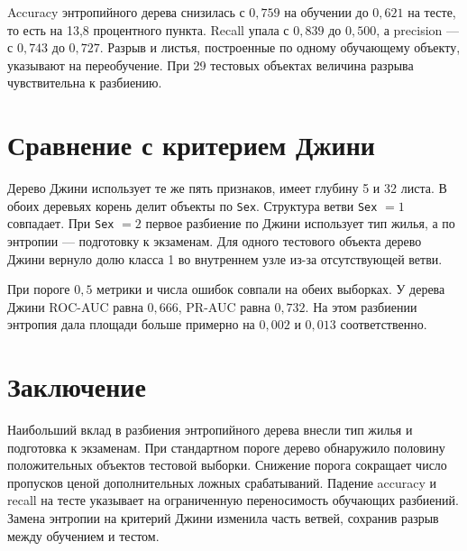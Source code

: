 Accuracy энтропийного дерева снизилась с \(0{,}759\) на обучении до
\(0{,}621\) на тесте, то есть на 13,8 процентного пункта. Recall упала
с \(0{,}839\) до \(0{,}500\), а precision --- с \(0{,}743\) до \(0{,}727\).
Разрыв и листья, построенные по одному обучающему объекту, указывают
на переобучение. При 29 тестовых объектах величина разрыва
чувствительна к разбиению.

\section{Сравнение с критерием Джини}

Дерево Джини использует те же пять признаков, имеет глубину 5 и
32 листа. В обоих деревьях корень делит объекты по \texttt{Sex}.
Структура ветви \texttt{Sex} \(=1\) совпадает. При \texttt{Sex} \(=2\)
первое разбиение по Джини использует тип жилья, а по энтропии ---
подготовку к экзаменам. Для одного тестового объекта дерево Джини
вернуло долю класса 1 во внутреннем узле из-за отсутствующей ветви.

При пороге \(0{,}5\) метрики и числа ошибок совпали на обеих выборках.
У дерева Джини ROC-AUC равна \(0{,}666\), PR-AUC равна \(0{,}732\).
На этом разбиении энтропия дала площади больше примерно на \(0{,}002\)
и \(0{,}013\) соответственно.

\section{Заключение}

Наибольший вклад в разбиения энтропийного дерева внесли тип жилья и
подготовка к экзаменам. При стандартном пороге дерево обнаружило
половину положительных объектов тестовой выборки. Снижение порога
сокращает число пропусков ценой дополнительных ложных срабатываний.
Падение accuracy и recall на тесте указывает на ограниченную
переносимость обучающих разбиений. Замена энтропии на критерий Джини
изменила часть ветвей, сохранив разрыв между обучением и тестом.
